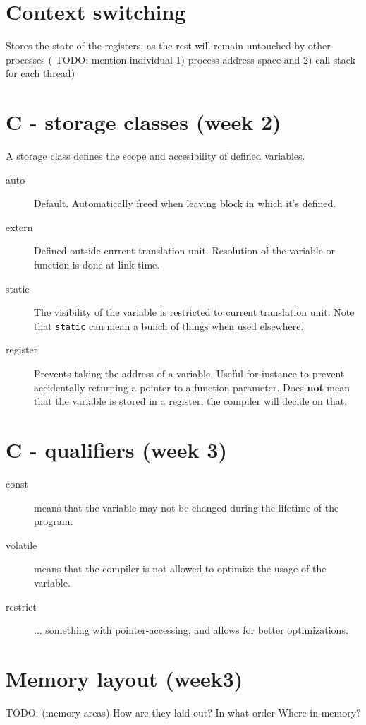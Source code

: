 \documentclass{article}
\begin{document}
\section*{Context switching}
Stores the state of the registers, as the rest will remain untouched by other processes (
TODO: mention individual 1) process address space and 2) call stack for each thread)

\section*{C - storage classes (week 2)}
A storage class defines the scope and accesibility of defined variables.
\begin{description}
\item[auto] Default. Automatically freed when leaving block in which it's defined.
\item[extern] Defined outside current translation unit. Resolution of the variable or function is done at link-time.
\item[static] The visibility of the variable is restricted to current translation unit. Note that \texttt{static} can mean a bunch of things when used elsewhere.
\item[register] Prevents taking the address of a variable. Useful for instance to prevent accidentally returning a pointer to a function parameter. Does \textbf{not} mean that the variable is stored in a register, the compiler will decide on that.
\end{description}


\section*{C - qualifiers (week 3)}
\begin{description}
	\item[const] means that the variable may not be changed during the lifetime of the program.
	\item[volatile] means that the compiler is not allowed to optimize the usage of the variable.
	\item[restrict] ... something with pointer-accessing, and allows for better optimizations.
\end{description}



\section*{Memory layout (week3)}
TODO: (memory areas) How are they laid out? In what order Where in memory?
\end{document}
